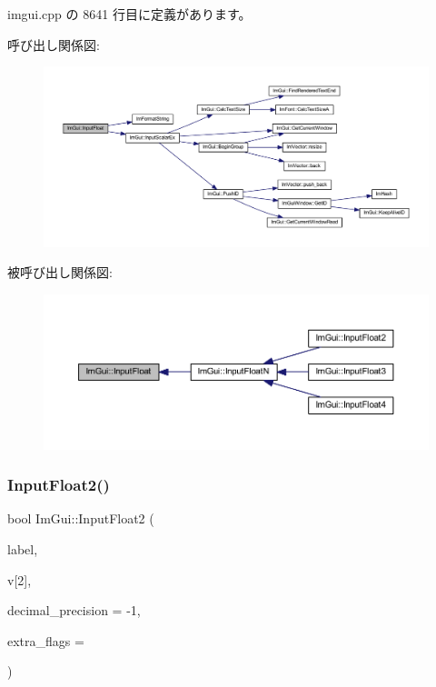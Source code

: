 imgui.\+cpp の 8641 行目に定義があります。

呼び出し関係図\+:\nopagebreak
\begin{figure}[H]
\begin{center}
\leavevmode
\includegraphics[width=350pt]{namespace_im_gui_a94e4bba578bb1ab757a85c86d4a659d8_cgraph}
\end{center}
\end{figure}
被呼び出し関係図\+:\nopagebreak
\begin{figure}[H]
\begin{center}
\leavevmode
\includegraphics[width=350pt]{namespace_im_gui_a94e4bba578bb1ab757a85c86d4a659d8_icgraph}
\end{center}
\end{figure}
\mbox{\label{namespace_im_gui_a0c7aea6408696de9696f38a2f32419c4}} 
\subsubsection{\texorpdfstring{Input\+Float2()}{InputFloat2()}}
{\footnotesize\ttfamily bool Im\+Gui\+::\+Input\+Float2 (\begin{DoxyParamCaption}\item[{const char $\ast$}]{label,  }\item[{float}]{v\mbox{[}2\mbox{]},  }\item[{int}]{decimal\+\_\+precision = {\ttfamily -\/1},  }\item[{\mbox{\hyperlink{imgui_8h_a7d2c6153a6b9b5d3178ce82434ac9fb8}{Im\+Gui\+Input\+Text\+Flags}}}]{extra\+\_\+flags = {} }\end{DoxyParamCaption})}



